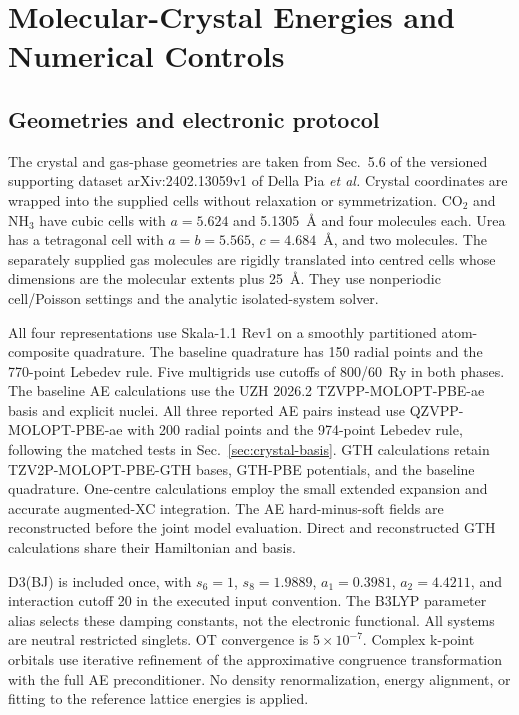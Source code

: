 \section{Molecular-Crystal Energies and Numerical Controls}
\label{sec:x23_si}

\subsection{Geometries and electronic protocol}
\label{sec:crystal-protocol}

The crystal and gas-phase geometries are taken from Sec.~5.6 of the versioned supporting dataset arXiv:2402.13059v1 of Della Pia \emph{et al.}\cite{DellaPia2024X23} Crystal coordinates are wrapped into the supplied cells without relaxation or symmetrization. CO$_2$ and NH$_3$ have cubic cells with $a=5.624$ and 5.1305~\AA{} and four molecules each. Urea has a tetragonal cell with $a=b=5.565$, $c=4.684$~\AA{}, and two molecules. The separately supplied gas molecules are rigidly translated into centred cells whose dimensions are the molecular extents plus 25~\AA{}. They use nonperiodic cell/Poisson settings and the analytic isolated-system solver.

All four representations use Skala-1.1 Rev1 on a smoothly partitioned atom-composite quadrature. The baseline quadrature has 150 radial points and the 770-point Lebedev rule. Five multigrids use cutoffs of 800/60~Ry in both phases. The baseline AE calculations use the UZH 2026.2 TZVPP-MOLOPT-PBE-ae basis and explicit nuclei. All three reported AE pairs instead use QZVPP-MOLOPT-PBE-ae with 200 radial points and the 974-point Lebedev rule, following the matched tests in Sec.~\ref{sec:crystal-basis}. GTH calculations retain TZV2P-MOLOPT-PBE-GTH bases, GTH-PBE potentials, and the baseline quadrature. One-centre calculations employ the small extended expansion and accurate augmented-XC integration. The AE hard-minus-soft fields are reconstructed before the joint model evaluation. Direct and reconstructed GTH calculations share their Hamiltonian and basis.

D3(BJ) is included once, with $s_6=1$, $s_8=1.9889$, $a_1=0.3981$, $a_2=4.4211$, and interaction cutoff 20 in the executed input convention.\cite{Grimme2010DFTD3,Grimme2011D3BJ} The B3LYP parameter alias selects these damping constants, not the electronic functional. All systems are neutral restricted singlets. OT convergence is $5\times10^{-7}$. Complex k-point orbitals use iterative refinement of the approximative congruence transformation with the full AE preconditioner. No density renormalization, energy alignment, or fitting to the reference lattice energies is applied.


